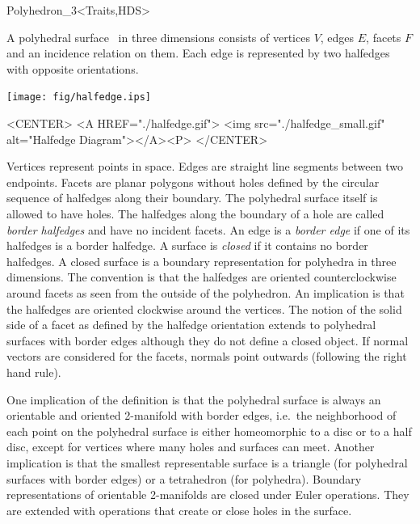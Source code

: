 \begin{ccClassTemplate}{Polyhedron_3<Traits,HDS>}
\label{sectionPolyhedron}

\ccDefinition  



A polyhedral surface \ccClassTemplateName\ in three dimensions
consists of vertices $V$, edges $E$, facets $F$ and an incidence
relation on them.  Each edge is represented by two halfedges with
opposite orientations.

\begin{ccTexOnly}
    \vspace{-7mm}
    \begin{center}
      \parbox{0.4\textwidth}{%
          \texttt{[image: fig/halfedge.ips]}%
      }
    \end{center}
    \vspace{-5mm}
\end{ccTexOnly}

\begin{ccHtmlOnly}
    <CENTER>
    <A HREF="./halfedge.gif">
        <img src="./halfedge_small.gif" alt="Halfedge Diagram"></A><P>
    </CENTER>
\end{ccHtmlOnly}

Vertices represent points in space. Edges are straight line segments
between two endpoints. Facets are planar polygons without holes
defined by the circular sequence of halfedges along their boundary.
The polyhedral surface itself is allowed to have holes. The halfedges
along the boundary of a hole are called {\em border halfedges\/} and
have no incident facets. An edge is a {\em border edge\/} if one of
its halfedges is a border halfedge.  A surface is {\em closed\/} if it
contains no border halfedges. A closed surface is a boundary
representation for polyhedra in three dimensions. The convention is
that the halfedges are oriented counterclockwise around facets as seen
from the outside of the polyhedron. An implication is that the
halfedges are oriented clockwise around the vertices. The notion of
the solid side of a facet as defined by the halfedge orientation
extends to polyhedral surfaces with border edges although they do not
define a closed object. If normal vectors are considered for the
facets, normals point outwards (following the right hand rule).

One implication of the definition is that the polyhedral surface is
always an orientable and oriented 2-manifold with border edges,
i.e.~the neighborhood of each point on the polyhedral surface is
either homeomorphic to a disc or to a half disc, except for vertices
where many holes and surfaces can meet. Another implication is that
the smallest representable surface is a triangle (for polyhedral
surfaces with border edges) or a tetrahedron (for polyhedra). Boundary
representations of orientable 2-manifolds are closed under Euler
operations. They are extended with operations that create or close
holes in the surface.


\end{ccClassTemplate}
